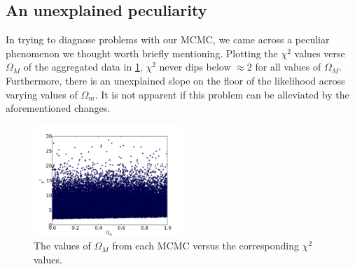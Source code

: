 \documentclass[aps,prl,reprint]{revtex4-1}
\begin{document}
\subsection{An unexplained peculiarity}
In trying to diagnose problems with our MCMC, we came across a peculiar phenomenon we thought worth briefly mentioning. Plotting the $\chi^2$ values verse $\Omega_M$ of the aggregated data in \cref{fig:chi2}, $\chi^2$ never dips below $\approx$2 for all values of $\Omega_M$. Furthermore, there is an unexplained slope on the floor of the likelihood across varying values of $\Omega_m$. It is not apparent if this problem can be alleviated by the aforementioned changes. 

\begin{figure}
 \includegraphics[width=0.5\textwidth]{../plots/om_chi.pdf}
\caption{\label{fig:chi2}The values of $\Omega_M$ from each MCMC versus the corresponding $\chi^2$ values.}
\end{figure}
 
 
\end{document}
